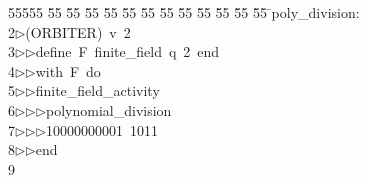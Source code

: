 %
%
\begin{tabbing}
55555 \= 55 \= 55 \= 55 \= 55 \= 55 \= 55 \= 55 \= 55 \= 55 \= 55 \= 55 \= 55 \= \>poly\_division:\\[0pt]
2\>$\triangleright$\>(ORBITER)\ v\ 2\ \\[0pt]
3\>$\triangleright$\>$\triangleright$\>define\ F\ finite\_field\ q\ 2\ end\ \\[0pt]
4\>$\triangleright$\>$\triangleright$\>with\ F\ do\ \\[0pt]
5\>$\triangleright$\>$\triangleright$\>finite\_field\_activity\ \\[0pt]
6\>$\triangleright$\>$\triangleright$\>$\triangleright$\>polynomial\_division\ \\[0pt]
7\>$\triangleright$\>$\triangleright$\>$\triangleright$\>10000000001\ 1011\ \\[0pt]
8\>$\triangleright$\>$\triangleright$\>end\\[0pt]
9\>\end{tabbing}
